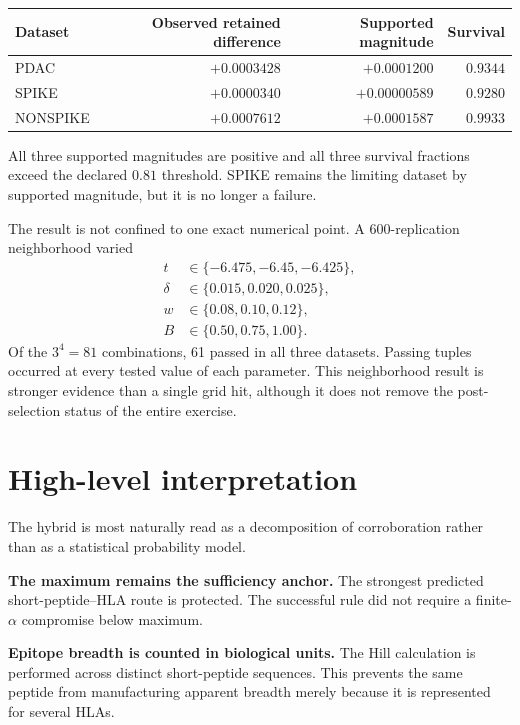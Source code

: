 \documentclass[11pt]{article}
\begin{document}
\begin{center}
\small
\begin{tabular}{@{}lrrr@{}}
\toprule
Dataset & Observed retained difference & Supported magnitude & Survival \\
\midrule
PDAC      & $+0.0003428$ & $+0.0001200$ & $0.9344$ \\
SPIKE     & $+0.0000340$ & $+0.00000589$ & $0.9280$ \\
NONSPIKE  & $+0.0007612$ & $+0.0001587$ & $0.9933$ \\
\bottomrule
\end{tabular}
\end{center}

All three supported magnitudes are positive and all three survival fractions
exceed the declared $0.81$ threshold. SPIKE remains the limiting dataset by
supported magnitude, but it is no longer a failure.

The result is not confined to one exact numerical point. A 600-replication
neighborhood varied
\begin{align*}
t&\in\{-6.475,-6.45,-6.425\},\\
\delta&\in\{0.015,0.020,0.025\},\\
w&\in\{0.08,0.10,0.12\},\\
B&\in\{0.50,0.75,1.00\}.
\end{align*}
Of the $3^4=81$ combinations, 61 passed in all three datasets. Passing tuples
occurred at every tested value of each parameter. This neighborhood result is
stronger evidence than a single grid hit, although it does not remove the
post-selection status of the entire exercise.

\section{High-level interpretation}

The hybrid is most naturally read as a decomposition of corroboration rather
than as a statistical probability model.

\textbf{The maximum remains the sufficiency anchor.}
The strongest predicted short-peptide--HLA route is protected. The successful
rule did not require a finite-$\alpha$ compromise below maximum.

\textbf{Epitope breadth is counted in biological units.}
The Hill calculation is performed across distinct short-peptide sequences.
This prevents the same peptide from manufacturing apparent breadth merely
because it is represented for several HLAs.
\end{document}
